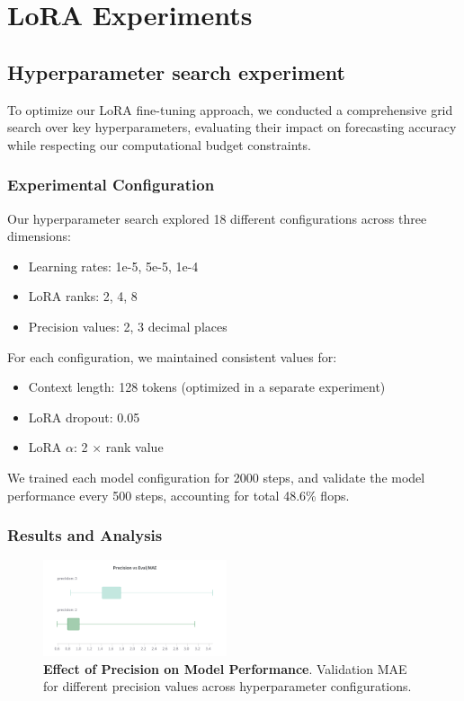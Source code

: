 \documentclass{article}
\begin{document}
\section*{LoRA Experiments}
\subsection*{Hyperparameter search experiment}
To optimize our LoRA fine-tuning approach, we conducted a comprehensive grid search over key hyperparameters, evaluating their impact on forecasting accuracy while respecting our computational budget constraints.

\subsubsection*{Experimental Configuration}
Our hyperparameter search explored 18 different configurations across three dimensions:
\begin{itemize}
    \item Learning rates: 1e-5, 5e-5, 1e-4
    \item LoRA ranks: 2, 4, 8
    \item Precision values: 2, 3 decimal places
\end{itemize}

For each configuration, we maintained consistent values for:
\begin{itemize}
    \item Context length: 128 tokens (optimized in a separate experiment)
    \item LoRA dropout: 0.05
    \item LoRA $\alpha$: 2 $\times$ rank value
\end{itemize}
We trained each model configuration for 2000 steps, and validate the model performance every 500 steps, accounting for total 48.6\% flops.
\subsubsection*{Results and Analysis}
\begin{figure}[h]
    \centering
    \includegraphics[width=0.48\textwidth]{precision}
    \caption{\textbf{Effect of Precision on Model Performance}. Validation MAE for different precision values across hyperparameter configurations.}
    \label{fig:hp_precision}
\end{figure}
\end{document}
